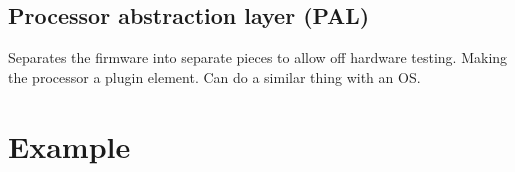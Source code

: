 \documentclass[11pt]{scrartcl} %
\begin{document}
\subsection{Processor abstraction layer (PAL)}

Separates the firmware into separate pieces to allow off hardware testing. Making the processor a 
plugin element. Can do a similar thing with an OS.

\section{Example}








\end{document}
